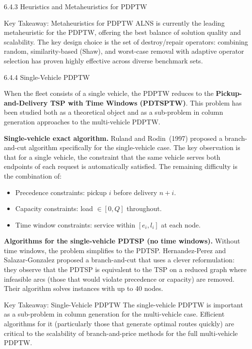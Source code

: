 \documentclass[aspectratio=169,10pt]{beamer}
\begin{document}
\begin{frame}[allowframebreaks]{6.4.3 Heuristics and Metaheuristics for PDPTW}
  \begin{alertblock}{Key Takeaway: Metaheuristics for PDPTW}
    ALNS is currently the leading metaheuristic for the PDPTW, offering the best
    balance of solution quality and scalability. The key design choice is the set of
    destroy/repair operators: combining random, similarity-based (Shaw), and worst-case
    removal with adaptive operator selection has proven highly effective across diverse
    benchmark sets.
  \end{alertblock}

\end{frame}

\begin{frame}[allowframebreaks]{6.4.4 Single-Vehicle PDPTW}

  When the fleet consists of a single vehicle, the PDPTW reduces to the
  \textbf{Pickup-and-Delivery TSP with Time Windows (PDTSPTW)}.  This problem has been
  studied both as a theoretical object and as a sub-problem in column generation approaches
  to the multi-vehicle PDPTW.

  \textbf{Single-vehicle exact algorithm.} Ruland and Rodin~(1997) proposed a branch-and-cut
  algorithm specifically for the single-vehicle case.  The key observation is that for a
  single vehicle, the constraint that the same vehicle serves both endpoints of each request
  is automatically satisfied.  The remaining difficulty is the combination of:
  \begin{itemize}
    \item Precedence constraints: pickup $i$ before delivery $n+i$.
    \item Capacity constraints: load $\in [0, Q]$ throughout.
    \item Time window constraints: service within $[e_i, l_i]$ at each node.
  \end{itemize}

  \textbf{Algorithms for the single-vehicle PDTSP (no time windows).} Without time windows,
  the problem simplifies to the PDTSP. Hernandez-Perez and Salazar-Gonzalez proposed a
  branch-and-cut that uses a clever reformulation: they observe that the PDTSP is
  equivalent to the TSP on a reduced graph where infeasible arcs (those that would violate
  precedence or capacity) are removed. Their algorithm solves instances with up to 40 nodes.

  \begin{alertblock}{Key Takeaway: Single-Vehicle PDPTW}
    The single-vehicle PDPTW is important as a sub-problem in column generation for
    the multi-vehicle case. Efficient algorithms for it (particularly those that generate
    optimal routes quickly) are critical to the scalability of branch-and-price methods
    for the full multi-vehicle PDPTW.
  \end{alertblock}

\end{frame}
\end{document}
